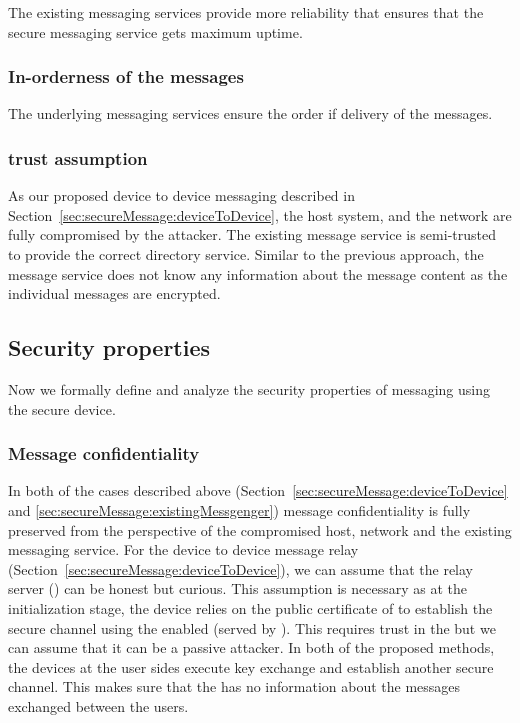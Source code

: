  The existing messaging services provide more reliability that ensures that the secure messaging service gets maximum uptime. 


\subsubsection{In-orderness of the messages}

The underlying messaging services ensure the order if delivery of the messages.

\subsubsection{trust assumption}

As our proposed device to device messaging described in Section~\ref{sec:secureMessage:deviceToDevice}, the host system, and the network are fully compromised by the attacker. The existing message service is semi-trusted to provide the correct directory service. Similar to the previous approach, the message service does not know any information about the message content as the individual messages are encrypted.

\subsection{Security properties}
\label{sec:secureMessage:securityProperty}

Now we formally define and analyze the security properties of messaging using the secure \usb device.

\subsubsection{Message confidentiality}

In both of the cases described above (Section~\ref{sec:secureMessage:deviceToDevice} and \ref{sec:secureMessage:existingMessgenger}) message confidentiality is fully preserved from the perspective of the compromised host, network and the existing messaging service. For the device to device message relay (Section~\ref{sec:secureMessage:deviceToDevice}), we can assume that the relay server (\relay) can be honest but curious. This assumption is necessary as at the initialization stage, the \usb device relies on the public certificate of \relay to establish the secure channel using the \webusb enabled \js (served by \relay). This requires trust in the \relay but we can assume that it can be a passive attacker. In both of the proposed methods, the \usb devices at the user sides execute key exchange and establish another secure channel. This makes sure that the \relay has no information about the messages exchanged between the users.

